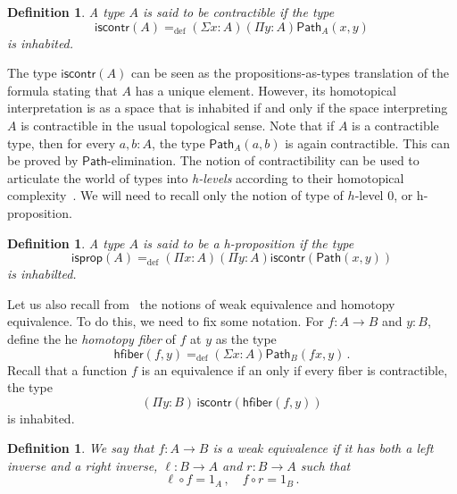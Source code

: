 \documentclass[10pt,a4paper,oneside,reqno]{amsart}
\numberwithin{equation}{section}
\theoremstyle{mythm}
\theoremstyle{mydef}
\newtheorem{definition}[theorem]{Definition}
\theoremstyle{myrmk}
\newcommand{\ie}{\text{i.e.\ }}
\newcommand{\defeq}{=_{\mathrm{def}}}
\newcommand{\co}{\colon}
\newcommand{\iscontr}{\mathsf{iscontr}}
\newcommand{\isprop}{\mathsf{isprop}}
\newcommand{\hfiber}{\mathsf{hfiber}}
\newcommand{\Id}{\mathsf{Path}}
\newcommand{\id}[1]{\Id_{#1}}
\begin{document}
\begin{definition}  A type $A$ is said to be \emph{contractible} if the  type 
 \begin{equation}
 \label{eq:contractible}
\iscontr(A) \defeq (\Sigma x:A)(\Pi y:A)\id{A}(x,y)
\end{equation}
is inhabited.
\end{definition} 

The type $\iscontr(A)$ can be seen as the propositions-as-types translation
of the formula stating that $A$ has a unique element. However, its homotopical interpretation 
is as a space that is inhabited if and only if the space interpreting $A$ is contractible in the usual
topological sense. Note that if $A$ is a contractible type, then for every $a, b : A$, the type $\id{A}(a,b)$ is again contractible. 
This can be proved  by $\Id$-elimination. The notion of contractibility can be used to articulate the world of types  into \emph{h-levels} according to their
homotopical complexity~\cite{VoevodskyV:unifc}. We will need to recall only the notion of type of $h$-level 0, or h-proposition.

\begin{definition} A type $A$ is said to be a \emph{h-proposition} if the type
\[
\isprop(A) \defeq (\Pi x : A)(\Pi y : A) \iscontr( \Id(x,y)) 
\]
is inhabilted.
\end{definition}


Let us also recall from~\cite{VoevodskyV:unifc} the notions of weak equivalence and homotopy equivalence. To do this, we need to fix some notation. For $f : A \rightarrow B$ and $y : B$, define the he \emph{homotopy fiber} of $f$ at $y$ as the type
\[
 \hfiber(f,y) \defeq (\Sigma x : A) \id{B}(f x, y) \, .
\]
Recall that a function $f$ is an equivalence if an only if every fiber is contractible, \ie the type
\[
 (\Pi y : B) \,  \iscontr(\hfiber(f,y)) 
\]
is inhabited. 


\begin{definition} \label{thm:weq}  We say that $f : A \rightarrow B$ is a weak equivalence if it has both a left inverse and a right inverse, \ie
$\ell \co B \to A$ and $r \co B \to A$ such that 
\[
 \ell \circ f = 1_A \, ,  \quad  f \circ r = 1_B  \, .
 \]
 \end{definition}
 
\end{document}
